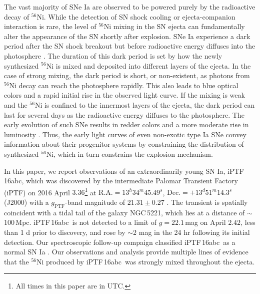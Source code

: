 \documentclass[twocolumn]{aastex61}
\newcommand{\abc}{iPTF\,16abc}
\begin{document}
The vast majority of SNe Ia are observed 
to be powered purely by the radioactive decay of $^{56}$Ni. 
While the detection of SN shock cooling or ejecta-companion interaction is rare, the level of $^{56}$Ni mixing in the SN ejecta can fundamentally alter the appearance of the SN shortly after explosion. SNe Ia experience a dark period after
the SN shock breakout but before radioactive energy  
diffuses into the photosphere \citep{2014ApJ...784...85P}. The 
duration of this dark period is set by how the newly synthesized 
$^{56}$Ni is mixed and deposited into different layers of the ejecta.
In the case of strong mixing, the dark period is short, or 
non-existent, as photons from $^{56}$Ni decay can reach the 
photosphere rapidly. This also leads to blue optical colors and a 
rapid initial rise in the observed light curve. If the mixing is 
weak and the $^{56}$Ni is confined to the innermost layers of the 
ejecta, the dark period can last for several days as the radioactive 
energy diffuses to the photosphere. The early evolution of such SNe 
results in redder colors and a more moderate rise in luminosity 
\citep{2016ApJ...826...96P}. Thus, the early light curves of even non-exotic type Ia SNe convey information about their progenitor systems by constraining the distribution of synthesized $^{56}$Ni, which in turn constrains the explosion mechanism.

In this paper, we report observations of an extraordinarily young SN
Ia, \abc, which was discovered by the intermediate Palomar
Transient Factory (iPTF) on 2016 April $3.36$\footnote{All times in this
  paper are in UTC.} at $\textrm{R.A.}=13^h34^m45.49^s$,
$\textrm{Dec.}=+13^d51^m14.3^s$ (J2000) with a $g_\mathrm{PTF}$-band magnitude of
$21.31\pm0.27$ \citep{2016ATel.8907....1M}. The
transient is spatially coincident with a tidal tail of the galaxy
NGC\,5221, which lies at a distance of $\sim$100\,Mpc. \abc\ is not detected to a limit of $g=22.1$\,mag on April $2.42$, less than 1 d prior to discovery, and rose by $\sim$2 mag in the 24 hr following its initial detection. Our spectroscopic follow-up
compaign classified \abc\ as a normal SN Ia
\citep{2016ATel.8909....1C}. Our observations and analysis provide multiple lines of evidence that the $^{56}$Ni produced by \abc\ was strongly mixed throughout the ejecta. 

\end{document}
